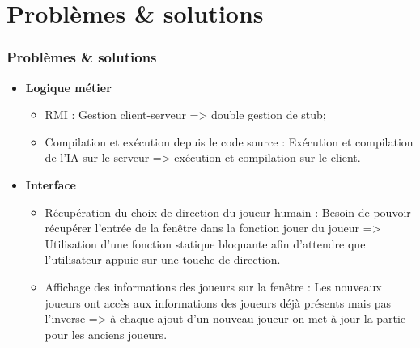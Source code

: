 \section{Problèmes \& solutions}

    \begin{frame}
        \frametitle{Problèmes \& solutions}

        \begin{itemize} 
		 \item \textbf{Logique métier}
		 	\begin{itemize}
		 		\item RMI : Gestion client-serveur => double gestion de stub;
		 		\item Compilation et exécution depuis le code source : Exécution et compilation de l'IA sur le serveur => exécution et compilation sur le client.
		 	\end{itemize}
		\item \textbf{Interface}
			\begin{itemize}
				\item Récupération du choix de direction du joueur humain : Besoin de pouvoir récupérer l'entrée de la fenêtre dans la fonction jouer du joueur => Utilisation d'une fonction statique bloquante afin d'attendre que l'utilisateur appuie sur une touche de direction.
				\item Affichage des informations des joueurs sur la fenêtre :  Les nouveaux joueurs ont accès aux informations des joueurs déjà présents mais pas l'inverse => à chaque ajout d'un nouveau joueur on met à jour la partie pour les anciens joueurs.
			\end{itemize}
		\end{itemize}
    \end{frame}
